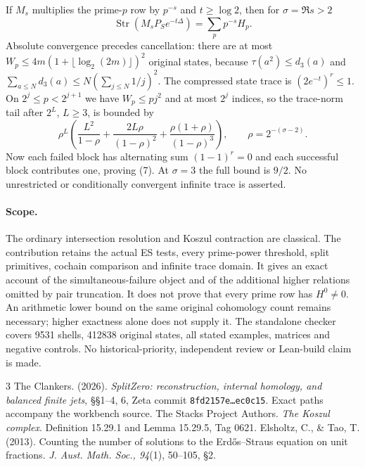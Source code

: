 \documentclass[10pt,a4paper]{article}
\begin{document}
If $M_s$ multiplies the prime-$p$ row by $p^{-s}$ and $t\ge\log2$, then
for $\sigma=\Re s>2$
\[
 \boxed{\operatorname{Str}(M_sP_Se^{-t\Delta})=\sum_p p^{-s}H_p.} \tag{7}
\]
Absolute convergence precedes cancellation: there are at most
$W_p\le4m(1+\lfloor\log_2(2m)\rfloor)^2$ original states, because
$\tau(a^2)\le d_3(a)$ and $\sum_{a\le N}d_3(a)\le N(\sum_{j\le N}1/j)^2$.
The compressed state trace is $(2e^{-t})^r\le1$.
On $2^j\le p<2^{j+1}$ we have $W_p\le pj^2$ and at most $2^j$ indices,
so the trace-norm tail after $2^L$, $L\ge3$, is bounded by
\[
 \rho^L\left(\frac{L^2}{1-\rho}+\frac{2L\rho}{(1-\rho)^2}
            +\frac{\rho(1+\rho)}{(1-\rho)^3}\right),
 \qquad \rho=2^{-(\sigma-2)}.
\]
Now each failed block has alternating sum $(1-1)^r=0$ and each successful
block contributes one, proving (7). At $\sigma=3$ the full bound is $9/2$.
No unrestricted or conditionally convergent infinite trace is asserted.

\paragraph{Scope.}
The ordinary intersection resolution and Koszul contraction are classical.
The contribution retains the actual ES tests, every prime-power threshold,
split primitives, cochain comparison and infinite trace domain. It gives an
exact account of the simultaneous-failure object and of the additional
higher relations omitted by pair truncation. It does not prove that every
prime row has $H^0\ne0$. An arithmetic lower bound on the same original
cohomology count remains necessary; higher exactness alone does not supply it.
The standalone checker covers 9531 shells, 412838 original states, all stated
examples, matrices and negative controls. No historical-priority, independent
review or Lean-build claim is made.

\begingroup\small
\begin{thebibliography}{3}
 The Clankers. (2026). \emph{SplitZero: reconstruction, internal homology, and balanced finite jets}, \S\S1--4, 6, Zeta commit \texttt{8fd2157e\ldots{}ec0c15}. Exact paths accompany the workbench source.
 The Stacks Project Authors. \emph{The Koszul complex}. Definition 15.29.1 and Lemma 15.29.5, Tag 0621.
 Elsholtz, C., \& Tao, T. (2013). Counting the number of solutions to the Erd\H{o}s--Straus equation on unit fractions. \emph{J. Aust. Math. Soc., 94}(1), 50--105, \S2.
\end{thebibliography}
\endgroup
\end{document}
